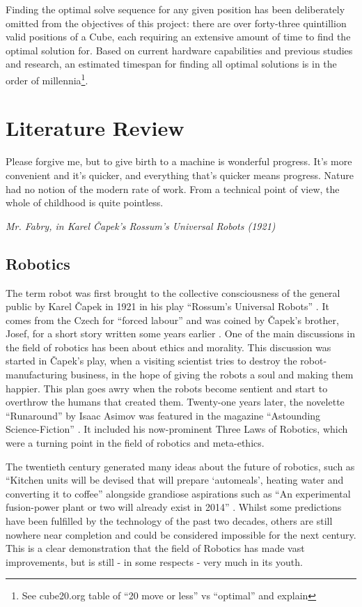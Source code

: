 \documentclass{report}
\begin{document}
    Finding the optimal solve sequence for any given position has been deliberately omitted from the objectives of this project: there are over forty-three quintillion valid positions of a Cube, each requiring an extensive amount of time to find the optimal solution for. Based on current hardware capabilities and previous studies and research, an estimated timespan for finding all optimal solutions is in the order of millennia\footnote{See cube20.org table of “20 move or less” vs “optimal” and explain}.
    
    \newpage
    \chapter{Literature Review}
    \epigraph{Please forgive me, but to give birth to a machine is wonderful progress. It's more convenient and it's quicker, and everything that's quicker means progress. Nature had no notion of the modern rate of work. From a technical point of view, the whole of childhood is quite pointless.}{\textit{Mr. Fabry, in Karel \v{C}apek's Rossum's Universal Robots (1921)}}
    
    \section{Robotics}
    The term robot was first brought to the collective consciousness of the general public by Karel \v{C}apek in 1921 in his play \enquote{Rossum's Universal Robots} \cite{Capek1921b}. It comes from the Czech for \enquote{forced labour} and was coined by \v{C}apek's brother, Josef, for a short story written some years earlier \cite{Etymonline2017}. One of the main discussions in the field of robotics has been about ethics and morality. This discussion was started in \v{C}apek's play, when a visiting scientist tries to destroy the robot-manufacturing business, in the hope of giving the robots a soul and making them happier. This plan goes awry when the robots become sentient and start to overthrow the humans that created them. Twenty-one years later, the novelette \enquote{Runaround} by Isaac Asimov was featured in the magazine \enquote{Astounding Science-Fiction} \cite{Asimov1942b}. It included his now-prominent Three Laws of Robotics, which were a turning point in the field of robotics and meta-ethics.
    
    The twentieth century generated many ideas about the future of robotics, such as \enquote{Kitchen units will be devised that will prepare \enquote{automeals}, heating water and converting it to coffee} alongside grandiose aspirations such as \enquote{An experimental fusion-power plant or two will already exist in 2014} \cite{Asimov1964b}. Whilst some predictions have been fulfilled by the technology of the past two decades, others are still nowhere near completion and could be considered impossible for the next century. This is a clear demonstration that the field of Robotics has made vast improvements, but is still - in some respects - very much in its youth.
    
\end{document}
